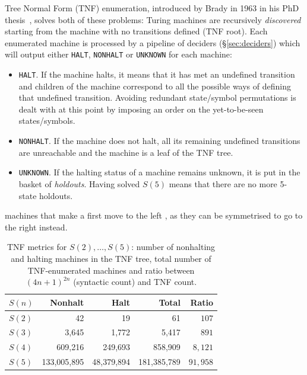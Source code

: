 \documentclass[sigconf,screen]{acmart}
\theoremstyle{definition} %
\numberwithin{equation}{section}
\theoremstyle{definition} %
\newcommand{\HALT}{\texttt{HALT}\xspace}
\newcommand{\NONHALT}{\texttt{NONHALT}\xspace}
\newcommand{\UNKNOWN}{\texttt{UNKNOWN}\xspace}
\begin{document}
Tree Normal Form (TNF) enumeration, introduced by Brady in 1963 in his PhD thesis~\cite{Brady64}, solves both of these problems: Turing machines are recursively \textit{discovered} starting from the machine with no transitions defined (TNF root). Each enumerated machine is processed by a pipeline of deciders (\S\ref{sec:deciders}) which will output either \HALT, \NONHALT or \UNKNOWN for each machine:
\begin{itemize}
    \item \HALT. If the machine halts, it means that it has met an undefined transition and children of the machine correspond to all the possible ways of defining that undefined transition. Avoiding redundant state/symbol permutations is dealt with at this point by imposing an order on the yet-to-be-seen states/symbols.
    \item \NONHALT. If the machine does not halt, all its remaining undefined transitions are unreachable and the machine is a leaf of the TNF tree.
    \item \UNKNOWN. If the halting status of a machine remains unknown, it is put in the basket of \textit{holdouts}. Having solved $S(5)$ means that there are no more 5-state holdouts.
\end{itemize}

 machines that make a first move to the left , as they can be symmetrised to go to the right instead. 

\begin{table}[h!]
    \caption{TNF metrics for $S(2),\dots,S(5)$: number of nonhalting and halting machines in the TNF tree, total number of TNF-enumerated machines and ratio between $(4n+1)^{2n}$ (syntactic count) and TNF count.}\label{tab:TNF-numbers}
    \centering
    \small
    \begin{tabular}{|l|r|r|r|r|}
        \hline
        $S(n)$ & Nonhalt     & Halt       & Total       & Ratio      \\
        \hline
        $S(2)$ & 42          & 19         & 61          & $107$      \\
        $S(3)$ & 3,645       & 1,772      & 5,417       & $891$      \\
        $S(4)$ & 609,216     & 249,693    & 858,909     & $8{,}121$  \\
        $S(5)$ & 133,005,895 & 48,379,894 & 181,385,789 & $91{,}958$ \\
        \hline
    \end{tabular}
\end{table}
\end{document}
